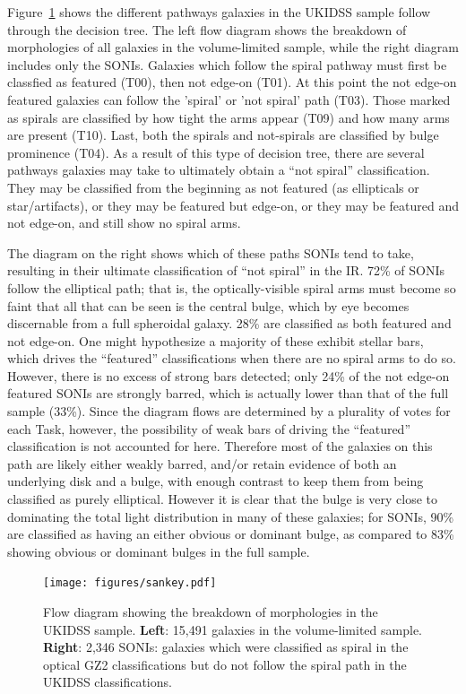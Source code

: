 Figure~\ref{fig:sankey} shows the different pathways galaxies in the UKIDSS sample follow through the decision tree. The left flow diagram shows the breakdown of morphologies of all galaxies in the volume-limited sample, while the right diagram includes only the SONIs. Galaxies which follow the spiral pathway must first be classfied as featured (T00), then not edge-on (T01). At this point the not edge-on featured galaxies can follow the 'spiral' or 'not spiral' path (T03). Those marked as spirals are classified by how tight the arms appear (T09) and how many arms are present (T10). Last, both the spirals and not-spirals are classified by bulge prominence (T04). As a result of this type of decision tree, there are several pathways galaxies may take to ultimately obtain a ``not spiral'' classification. They may be classified from the beginning as not featured (as ellipticals or star/artifacts), or they may be featured but edge-on, or they may be featured and not edge-on, and still show no spiral arms.

The diagram on the right shows which of these paths SONIs tend to take, resulting in their ultimate classification of ``not spiral'' in the IR. 72\% of SONIs follow the elliptical path; that is, the optically-visible spiral arms must become so faint that all that can be seen is the central bulge, which by eye becomes discernable from a full spheroidal galaxy. 28\% are classified as both featured and not edge-on. One might hypothesize a majority of these exhibit stellar bars, which drives the ``featured'' classifications when there are no spiral arms to do so. However, there is no excess of strong bars detected; only 24\% of the not edge-on featured SONIs are strongly barred, which is actually lower than that of the full sample (33\%). Since the diagram flows are determined by a plurality of votes for each Task, however, the possibility of weak bars of driving the ``featured'' classification is not accounted for here. Therefore most of the galaxies on this path are likely either weakly barred, and/or retain evidence of both an underlying disk and a bulge, with enough contrast to keep them from being classified as purely elliptical. However it is clear that the bulge is very close to dominating the total light distribution in many of these galaxies; for SONIs, 90\% are classified as having an either obvious or dominant bulge, as compared to 83\% showing obvious or dominant bulges in the full sample. 



\begin{figure}
\centering
\texttt{[image: figures/sankey.pdf]}
\caption{Flow diagram showing the breakdown of morphologies in the UKIDSS sample. \textbf{Left}: 15,491 galaxies in the volume-limited sample. \textbf{Right}: 2,346 SONIs: galaxies which were classified as spiral in the optical GZ2 classifications but do not follow the spiral path in the UKIDSS classifications.}
\label{fig:sankey}
\end{figure}

